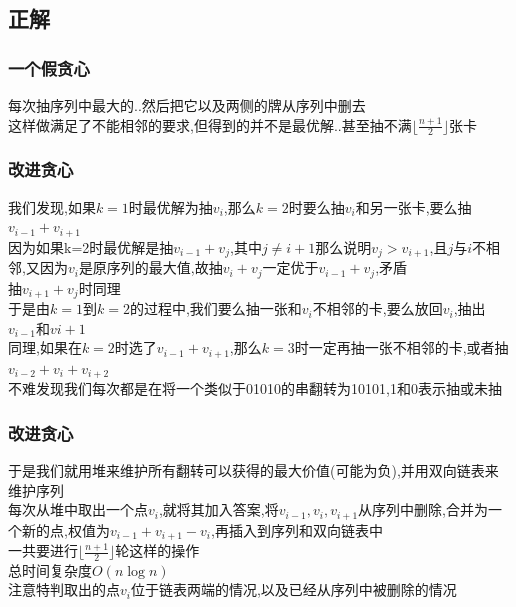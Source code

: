 \documentclass{beamer}
\begin{document}
		\subsection{正解}
			\begin{frame}\frametitle{一个假贪心}
				每次抽序列中最大的..然后把它以及两侧的牌从序列中删去\\
				这样做满足了不能相邻的要求,但得到的并不是最优解..甚至抽不满$\lfloor\frac{n+1}{2}\rfloor$张卡
			\end{frame}
			\begin{frame}\frametitle{改进贪心}
				我们发现,如果$k=1$时最优解为抽$v_i$,那么$k=2$时要么抽$v_i$和另一张卡,要么抽$v_{i-1}+v_{i+1}$\\
				因为如果k=2时最优解是抽$v_{i-1}+v_j$,其中$j\neq i+1$那么说明$v_j>v_{i+1}$,且$j$与$i$不相邻,又因为$v_i$是原序列的最大值,故抽$v_i+v_j$一定优于$v_{i-1}+v_j$,矛盾\\
				抽$v_{i+1}+v_j$时同理\\
				于是由$k=1$到$k=2$的过程中,我们要么抽一张和$v_i$不相邻的卡,要么放回$v_i$,抽出$v_{i-1}$和$v{i+1}$\\
				同理,如果在$k=2$时选了$v_{i-1}+v_{i+1}$,那么$k=3$时一定再抽一张不相邻的卡,或者抽$v_{i-2}+v_i+v_{i+2}$\\
				不难发现我们每次都是在将一个类似于01010的串翻转为10101,1和0表示抽或未抽\\
			\end{frame}
			\begin{frame}\frametitle{改进贪心}
				于是我们就用堆来维护所有翻转可以获得的最大价值(可能为负),并用双向链表来维护序列\\
				每次从堆中取出一个点$v_i$,就将其加入答案,将$v_{i-1},v_i,v_{i+1}$从序列中删除,合并为一个新的点,权值为$v_{i-1}+v_{i+1}-v_i$,再插入到序列和双向链表中\\
				一共要进行$\lfloor\frac{n+1}{2}\rfloor$轮这样的操作\\
				总时间复杂度$O(n\log n)$\\
				注意特判取出的点$v_i$位于链表两端的情况,以及已经从序列中被删除的情况
			\end{frame}
\end{document}
